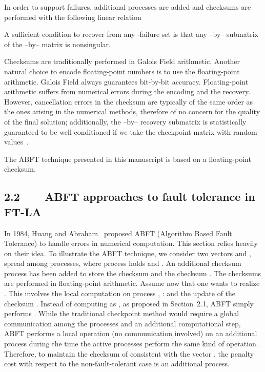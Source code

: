 \documentclass[pdftex,11pt]{article}
\begin{document}
In order to support  failures,  additional processes are added
and  checksums are performed with the following linear relation

A sufficient condition to recover from any -failure set is that any
--by-- submatrix of the --by-- matrix  is nonsingular.


Checksums are traditionally performed in Galois Field
arithmetic. Another natural choice to encode floating-point numbers is
to use the floating-point arithmetic. Galois Field always guarantees
bit-by-bit accuracy. Floating-point arithmetic suffers from numerical
errors during the encoding and the recovery. However, cancellation
errors in the checksum are typically of the same order as the ones
arising in the numerical methods, therefore of no concern for the
quality of the final solution; additionally, the --by-- recovery
submatrix is statistically guaranteed to be well-conditioned if we
take the checkpoint matrix  with random values~\cite{ChDo:05}.

The ABFT technique presented in this manuscript is based on a
floating-point checksum.

\subsection*{\color{DodgerBlue4}2.2~~~~ABFT approaches to fault
  tolerance in FT-LA}

In 1984, Huang and Abraham~\cite{HuAb:84} proposed ABFT (Algorithm
Based Fault Tolerance) to handle errors in numerical computation. This
section relies heavily on their idea. To illustrate the ABFT
technique, we consider two vectors  and , spread among 
processes, where process  holds  and . An additional
checksum process has been added to store the checksum  and the checksum . The
checksums are performed in floating-point arithmetic. Assume now that
one wants to realize .  This involves the local computation
on process ,  :  and the update of
the checksum . Instead of computing  as , as proposed in Section~\color{DodgerBlue4}2.1\color{black},
ABFT simply performs . While the traditional
checkpoint method would require a global communication among the 
processes and an additional computational step, ABFT performs a local
operation (no communication involved) on an additional process during
the time the active processes perform the same kind of operation.
Therefore, to maintain the checksum of  consistent with the
vector , the penalty cost with respect to the non-fault-tolerant
case is an additional process.
\end{document}

